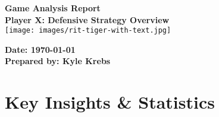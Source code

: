 \documentclass[a4paper,12pt]{article}
\begin{document}
\begin{titlepage}
    \centering
    {\Huge \textbf{Game Analysis Report}}\\[1.5cm]
    
    {\Large \textbf{Player X: Defensive Strategy Overview}}\\[2cm]
    
    \texttt{[image: images/rit-tiger-with-text.jpg]} %
    
    \vfill
    
    \textbf{Date: \today}\\[1cm]
    \textbf{Prepared by: Kyle Krebs}
\end{titlepage}

\section*{Key Insights \& Statistics}

\vspace{1em}
\end{document}
